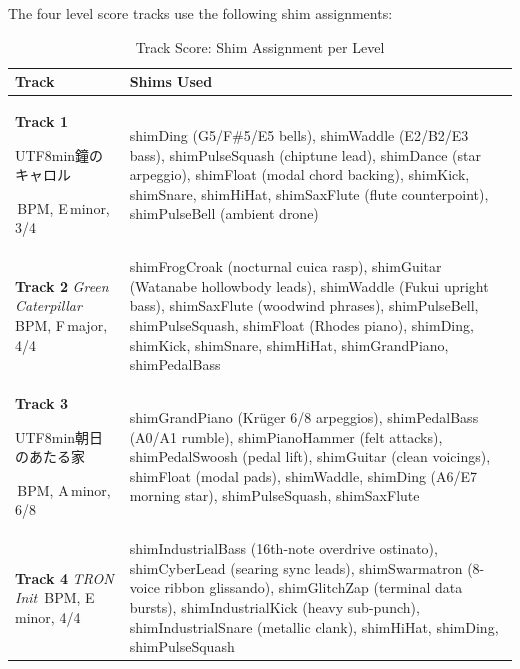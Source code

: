 \documentclass[10pt,journal,compsoc,twocolumn]{article}
\newcommand{\ja}[1]{\begin{CJK*}{UTF8}{min}#1\end{CJK*}}
\begin{document}
The four level score tracks use the following shim assignments:

\begin{table}[h]
\centering
\caption{Track Score: Shim Assignment per Level}
\label{tab:tracks}
\scriptsize
\setlength{\tabcolsep}{3pt}
\renewcommand{\arraystretch}{1.1}
\begin{tabularx}{\columnwidth}{@{}
  >{\raggedright\arraybackslash}p{2.4cm}
  >{\raggedright\arraybackslash}X
@{}}
\toprule
\textbf{Track} & \textbf{Shims Used} \\
\midrule
\textbf{Track 1} \newline
\ja{鐘のキャロル} \newline
168\,BPM, E\,minor, 3/4 &
shimDing (G5/F\#5/E5 bells), shimWaddle (E2/B2/E3 bass),
shimPulseSquash (chiptune lead), shimDance (star arpeggio),
shimFloat (modal chord backing), shimKick, shimSnare,
shimHiHat, shimSaxFlute (flute counterpoint),
shimPulseBell (ambient drone) \\
\midrule
\textbf{Track 2} \newline
\emph{Green Caterpillar} \newline
98\,BPM, F\,major, 4/4 &
shimFrogCroak (nocturnal cuica rasp),
shimGuitar (Watanabe hollowbody leads),
shimWaddle (Fukui upright bass),
shimSaxFlute (woodwind phrases), shimPulseBell,
shimPulseSquash, shimFloat (Rhodes piano),
shimDing, shimKick, shimSnare, shimHiHat,
shimGrandPiano, shimPedalBass \\
\midrule
\textbf{Track 3} \newline
\ja{朝日のあたる家} \newline
72\,BPM, A\,minor, 6/8 &
shimGrandPiano (Kr\"{u}ger 6/8 arpeggios),
shimPedalBass (A0/A1 rumble),
shimPianoHammer (felt attacks),
shimPedalSwoosh (pedal lift),
shimGuitar (clean voicings),
shimFloat (modal pads),
shimWaddle, shimDing (A6/E7 morning star),
shimPulseSquash, shimSaxFlute \\
\midrule
\textbf{Track 4} \newline
\emph{TRON Init} \newline
132\,BPM, E\,minor, 4/4 &
shimIndustrialBass (16th-note overdrive ostinato),
shimCyberLead (searing sync leads),
shimSwarmatron (8-voice ribbon glissando),
shimGlitchZap (terminal data bursts),
shimIndustrialKick (heavy sub-punch),
shimIndustrialSnare (metallic clank),
shimHiHat, shimDing, shimPulseSquash \\
\bottomrule
\end{tabularx}
\end{table}
\end{document}
